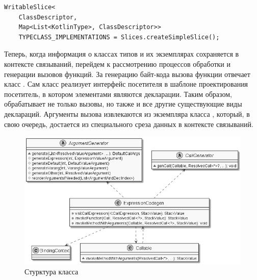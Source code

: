 % 
\begin{lstlisting}[style={wo_caption}]
WritableSlice<
    ClassDescriptor, 
    Map<List<KotlinType>, ClassDescriptor>> 
    TYPECLASS_IMPLEMENTATIONS = Slices.createSimpleSlice();
\end{lstlisting}

Теперь, когда информация о классах типов и их экземплярах сохраняется в контексте связываний, перейдем к рассмотрению процессов обработки и генерации вызовов функций. За генерацию байт-кода вызова функции отвечает класс . Сам класс реализует интерфейс посетителя в шаблоне проектирования  посетитель, в котором элементами являются декларации. Таким образом,  обрабатывает не только вызовы, но также и все другие существующие виды деклараций. Аргументы вызова извлекаются из экземпляра класса , который, в свою очередь, достается из специального среза данных в контексте связываний.     

\begin{figure}[htbp]
    \centering
    \includegraphics[width=\textwidth]{resources/06/11_expression_codegen.png}
    \caption{Стурктура класса }
    \label{fig:expression-codegen}
\end{figure}

